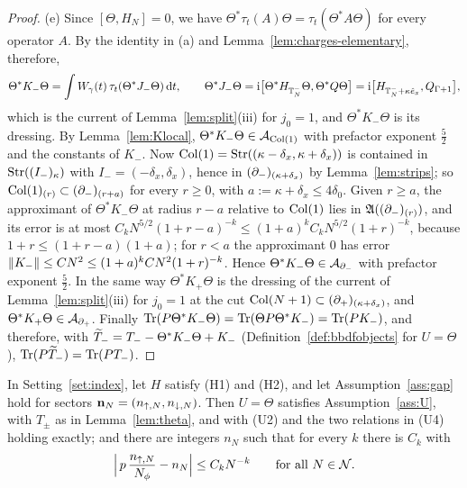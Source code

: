 \begin{proof}
(e) Since $[\Theta,H_N]=0$, we have $\Theta^*\tau_t(A)\Theta=\tau_t(\Theta^*A\Theta)$ for every operator $A$. By the
identity in (a) and Lemma~\ref{lem:charges-elementary}, therefore,
\[
\Theta^*K_-\Theta=\int W_{\gamma}(t)\,\tau_t(\Theta^*J_-\Theta)\,\mathrm{d} t,\qquad
\Theta^*J_-\Theta=\mathrm{i}\bigl[\Theta^*H_{\mathbb{T}_N^-}\Theta,\Theta^*Q\Theta\bigr]=\mathrm{i}\bigl[H_{\mathbb{T}_N^-+\kappa\hat{e}_x},Q_{\Gamma+1}\bigr],
\]
which is the current of Lemma~\ref{lem:split}(iii) for $j_0=1$, and $\Theta^*K_-\Theta$ is its dressing. By
Lemma~\ref{lem:Klocal}, $\Theta^*K_-\Theta\in\mathcal{A}_{\mathrm{Col}(1)}$ with prefactor exponent $\frac52$ and the constants of $K_-$. Now
$\mathrm{Col}(1)=\mathrm{Str}((\kappa-\delta_x,\kappa+\delta_x))$ is contained in $\mathrm{Str}((I_-)_\kappa)$ with $I_-=(-\delta_x,\delta_x)$, hence in
$(\partial_{-})_{(\kappa+\delta_x)}$ by Lemma~\ref{lem:strips}; so $\mathrm{Col}(1)_{(r)}\subset(\partial_{-})_{(r+a)}$ for every $r\ge0$,
with $a:=\kappa+\delta_x\le4\delta_0$. Given $r\ge a$, the approximant of $\Theta^*K_-\Theta$ at radius $r-a$ relative to
$\mathrm{Col}(1)$ lies in $\mathfrak{A}((\partial_{-})_{(r)})$, and its error is at most $C_kN^{5/2}(1+r-a)^{-k}\le(1+a)^kC_kN^{5/2}(1+r)^{-k}$,
because $1+r\le(1+r-a)(1+a)$; for $r<a$ the approximant $0$ has error $\lVert K_-\rVert\le CN^2\le(1+a)^kCN^2(1+r)^{-k}$. Hence
$\Theta^*K_-\Theta\in\mathcal{A}_{\partial_{-}}$ with prefactor exponent $\frac52$. In the same way $\Theta^*K_+\Theta$ is the dressing of the
current of Lemma~\ref{lem:split}(iii) for $j_0=1$ at the cut $\mathrm{Col}(N+1)\subset(\partial_{+})_{(\kappa+\delta_x)}$, and
$\Theta^*K_+\Theta\in\mathcal{A}_{\partial_{+}}$. Finally $\operatorname{Tr}(P\Theta^*K_-\Theta)=\operatorname{Tr}(\Theta P\Theta^*K_-)=\operatorname{Tr}(PK_-)$, and therefore, with
$\widetilde{T}_{-}=T_--\Theta^*K_-\Theta+K_-$ (Definition~\ref{def:bbdfobjects} for $U=\Theta$), $\operatorname{Tr}(P\widetilde{T}_{-})=\operatorname{Tr}(PT_-)$.
\end{proof}

\begin{corollary}\label{cor:translation}
In Setting~\ref{set:index}, let $H$ satisfy (H1) and (H2), and let Assumption~\ref{ass:gap} hold for sectors
$\mathbf{n}_N=(n_{{\uparrow},N},n_{{\downarrow},N})$. Then $U=\Theta$ satisfies Assumption~\ref{ass:U}, with $T_\pm$ as in
Lemma~\ref{lem:theta}, and with (U2) and the two relations in (U4) holding exactly; and there are integers $n_N$ such
that for every $k$ there is $C_k$ with
\[
\Bigl\lvert\,p\,\frac{n_{{\uparrow},N}}{N_{\phi}}-n_N\Bigr\rvert\le C_kN^{-k}\qquad\text{for all }N\in\mathcal N .
\]
\end{corollary}

